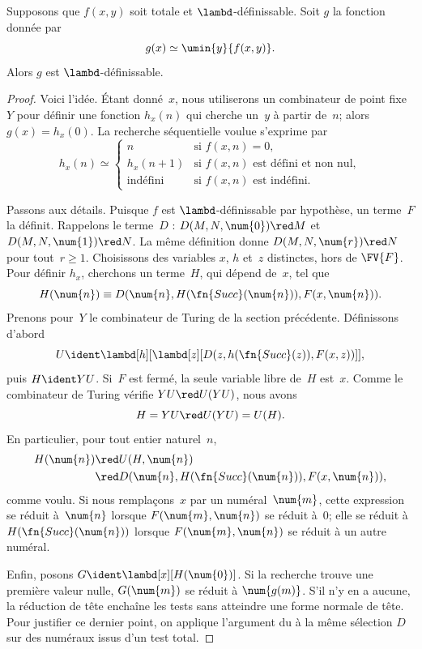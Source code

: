 \documentclass[../../../include/open-logic-section]{subfiles}
\begin{document}

\begin{lem}
Supposons que $f(x,y)$ soit totale et $\lambd$-définissable.
Soit $g$ la fonction donnée par
\[
g(x)\simeq\umin{y}{f(x,y)}.
\]
Alors $g$ est $\lambd$-définissable.
\end{lem}

\begin{proof}
Voici l'idée. Étant donné~$x$, nous utiliserons
un combinateur de point fixe~$Y$ pour définir
une fonction $h_x(n)$ qui cherche un~$y$ à partir
de~$n$; alors $g(x)=h_x(0)$. La recherche
séquentielle voulue s'exprime par
\[
h_x(n)\simeq
\begin{cases}
n & \text{si $f(x,n)=0$},\\
h_x(n+1) & \text{si $f(x,n)$ est défini et non nul},\\
\text{indéfini} & \text{si $f(x,n)$ est indéfini}.
\end{cases}
\]

Passons aux détails. Puisque $f$ est
$\lambd$-définissable par hypothèse, un
terme~$F$ la définit. Rappelons le terme~$D$ :
$D(M,N,\num{0})\red M$ et
$D(M,N,\num{1})\red N$. La même définition
donne $D(M,N,\num{r})\red N$ pour tout~$r\ge1$.
Choisissons des variables $x$, $h$ et~$z$ distinctes, hors de $\FV{F}$. Pour définir $h_x$,
cherchons un terme~$H$, qui dépend de~$x$, tel que
\[
H(\num{n})\equiv
D(\num{n},H(\fn{Succ}(\num{n})),F(x,\num{n})).
\]
Prenons pour~$Y$ le combinateur de Turing
de la section précédente. Définissons d'abord
\[
U\ident\lambd[h][\lambd[z][D(z,h(\fn{Succ}(z)),F(x,z))]],
\]
puis $H\ident YU$. Si~$F$ est fermé, la seule
variable libre de~$H$ est~$x$. Comme
le combinateur de Turing vérifie
$Y U\red U(Y U)$, nous avons
\[
H=YU\red U(YU)=U(H).
\]
En particulier, pour tout entier naturel~$n$,
\begin{align*}
H(\num{n}) & \red U(H,\num{n}) \\
& \red D(\num{n},H(\fn{Succ}(\num{n})),F(x,\num{n})),
\end{align*}
comme voulu. Si nous remplaçons~$x$ par un
numéral~$\num{m}$, cette expression se réduit
à~$\num{n}$ lorsque $F(\num{m},\num{n})$
se réduit à~$\num{0}$; elle se réduit à
$H(\fn{Succ}(\num{n}))$ lorsque
$F(\num{m},\num{n})$ se réduit à un autre
numéral.

Enfin, posons $G\ident\lambd[x][H(\num{0})]$.
Si la recherche trouve une première valeur nulle, $G(\num{m})$
se réduit à $\num{g(m)}$. S'il n'y en a aucune, la réduction de
tête enchaîne les tests sans atteindre une forme normale de tête.
Pour justifier ce dernier point, on applique l'argument du
 à la même
sélection $D$ sur des numéraux issus d'un test total.
\end{proof}
\end{document}
